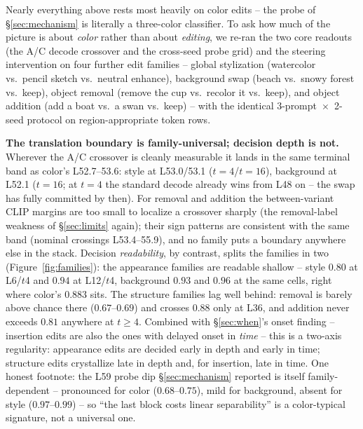 \documentclass[10pt,twocolumn]{article}
\begin{document}
Nearly everything above rests most heavily on color edits -- the probe
of \S\ref{sec:mechanism} is literally a three-color classifier. To ask
how much of the picture is about \emph{color} rather than about
\emph{editing}, we re-ran the two core readouts (the A/C decode
crossover and the cross-seed probe grid) and the steering intervention
on four further edit families -- global stylization (watercolor vs.\
pencil sketch vs.\ neutral enhance), background swap (beach vs.\ snowy
forest vs.\ keep), object removal (remove the cup vs.\ recolor it vs.\
keep), and object addition (add a boat vs.\ a swan vs.\ keep) -- with
the identical 3-prompt~$\times$~2-seed protocol on region-appropriate
token rows.

\textbf{The translation boundary is family-universal; decision depth is
not.} Wherever the A/C crossover is cleanly measurable it lands in the
same terminal band as color's L52.7--53.6: style at L53.0/53.1
($t{=}4$/$t{=}16$), background at L52.1 ($t{=}16$; at $t{=}4$ the
standard decode already wins from L48 on -- the swap has fully committed
by then). For removal and addition the between-variant CLIP margins are
too small to localize a crossover sharply (the removal-label weakness of
\S\ref{sec:limits} again); their sign patterns are consistent with the
same band (nominal crossings L53.4--55.9), and no family puts a boundary
anywhere else in the stack. Decision \emph{readability}, by contrast,
splits the families in two (Figure~\ref{fig:families}): the appearance
families are readable shallow -- style $0.80$ at L6/$t$4 and $0.94$ at
L12/$t$4, background $0.93$ and $0.96$ at the same cells, right where
color's $0.883$ sits. The structure families lag well behind: removal
is barely above chance there ($0.67$--$0.69$) and crosses $0.88$ only
at L36, and addition never exceeds $0.81$ anywhere at $t\ge4$.
Combined with \S\ref{sec:when}'s
onset finding -- insertion edits are also the ones with delayed onset in
\emph{time} -- this is a two-axis regularity: appearance edits are
decided early in depth and early in time; structure edits crystallize
late in depth and, for insertion, late in time. One honest footnote: the
L59 probe dip \S\ref{sec:mechanism} reported is itself family-dependent
-- pronounced for color ($0.68$--$0.75$), mild for background, absent
for style ($0.97$--$0.99$) -- so ``the last block costs linear
separability'' is a color-typical signature, not a universal one.
\end{document}
